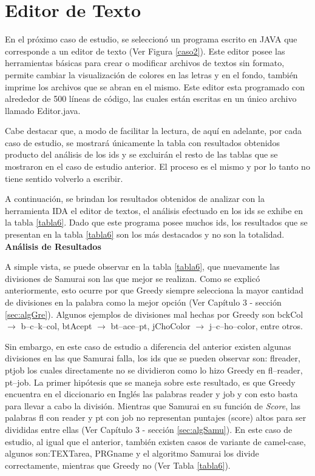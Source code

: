 \section{Editor de Texto}

En el próximo caso de estudio, se seleccionó un programa escrito en JAVA que corresponde a un editor de texto (Ver Figura \ref{caso2}). Este editor posee las herramientas básicas para crear o modificar archivos de textos sin formato, permite cambiar la visualización de colores en las letras y en el fondo, también imprime los archivos que se abran en el mismo.
Este editor esta programado con alrededor de 500 líneas de código, las cuales están escritas en un único archivo llamado Editor.java. 

Cabe destacar que, a modo de facilitar la lectura, de aquí en adelante, por cada caso de estudio, se mostrará únicamente la tabla con resultados obtenidos producto del análisis de los ids y se excluirán el resto de las tablas que se mostraron en el caso de estudio anterior. El proceso es el mismo y por lo tanto no tiene sentido volverlo a escribir.

A continuación, se brindan los resultados obtenidos de analizar con la herramienta IDA el editor de textos, el análisis efectuado en los ids se exhibe en la tabla \ref{tabla6}. Dado que este programa posee muchos ids, los resultados que se presentan en la tabla \ref{tabla6} son los más destacados y no son la totalidad.\\

\noindent \textbf{Análisis de Resultados\\}

A simple vista, se puede observar en la tabla \ref{tabla6}, que nuevamente las divisiones de Samurai son las que mejor se realizan.
Como se explicó anteriormente, esto ocurre por que Greedy siempre selecciona la mayor cantidad de divisiones en la palabra como la mejor opción (Ver Capítulo 3 - sección \ref{sec:algGre}). Algunos ejemplos de divisiones mal hechas por Greedy son \textsf{bckCol} $\rightarrow$ \textsf{b--c--k--col},
\textsf{btAcept} $\rightarrow$ \textsf{bt--ace--pt}, \textsf{jChoColor} $\rightarrow$ \textsf{j--c--ho--color}, entre otros. 

Sin embargo, en este caso de estudio a diferencia del anterior existen algunas divisiones en las que Samurai falla, los ids que se pueden observar son: \textsf{flreader}, \textsf{ptjob} los cuales directamente no se dividieron como lo hizo Greedy en \mbox{\textsf{fl--reader}}, \textsf{pt--job}. La primer hipótesis que se maneja sobre este resultado, es que Greedy encuentra en el diccionario en Inglés las palabras \textsf{reader} y \textsf{job} y con esto basta para llevar a cabo la división. Mientras que Samurai en su función de \textit{Score}, las palabras \textsf{fl} con \textsf{reader} y \textsf{pt} con \textsf{job} no representan puntajes (score) altos para ser divididas entre ellas (Ver Capítulo 3 - sección \ref{sec:algSamu}). En este caso de estudio, al igual que el anterior, también existen casos de variante de camel-case, algunos son:\textsf{TEXTarea}, \textsf{PRGname} y el algoritmo Samurai los divide correctamente, mientras que Greedy no (Ver Tabla \ref{tabla6}).

